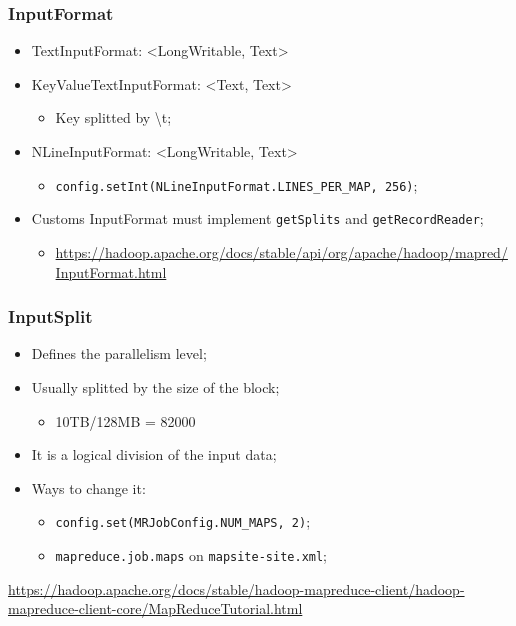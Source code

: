 \documentclass[aspectratio=169]{beamer}
\begin{document}
\begin{frame}
	\frametitle{InputFormat}

	\begin{itemize}
		\item TextInputFormat: <LongWritable, Text>
		\item KeyValueTextInputFormat: <Text, Text>
		      \begin{itemize}
			      \item Key splitted by \textbackslash t;
		      \end{itemize}
		\item NLineInputFormat: <LongWritable, Text>
		      \begin{itemize}
			      \item {\scriptsize \texttt{config.setInt(NLineInputFormat.LINES\_PER\_MAP, 256)}};
		      \end{itemize}
		\item Customs InputFormat must implement \texttt{getSplits} and \texttt{getRecordReader};
		      \begin{itemize}
			      \item {\tiny \href{https://hadoop.apache.org/docs/stable/api/org/apache/hadoop/mapred/InputFormat.html}{https://hadoop.apache.org/docs/stable/api/org/apache/hadoop/mapred/InputFormat.html}}
		      \end{itemize}
	\end{itemize}
\end{frame}

\begin{frame}
	\frametitle{InputSplit}

	\begin{itemize}
		\item Defines the parallelism level;
		\item Usually splitted by the size of the block;
		      \begin{itemize}
			      \item 10TB/128MB = 82000
		      \end{itemize}
		\item It is a logical division of the input data;
		\item Ways to change it:
		      \begin{itemize}
			      \item {\scriptsize \texttt{config.set(MRJobConfig.NUM\_MAPS, 2)}};
			      \item {\scriptsize \texttt{mapreduce.job.maps} on \texttt{mapsite-site.xml}};
		      \end{itemize}
	\end{itemize}

	\begin{center}
		{\tiny \href{https://hadoop.apache.org/docs/stable/hadoop-mapreduce-client/hadoop-mapreduce-client-core/MapReduceTutorial.html}{https://hadoop.apache.org/docs/stable/hadoop-mapreduce-client/hadoop-mapreduce-client-core/MapReduceTutorial.html}}
	\end{center}
\end{frame}
\end{document}
